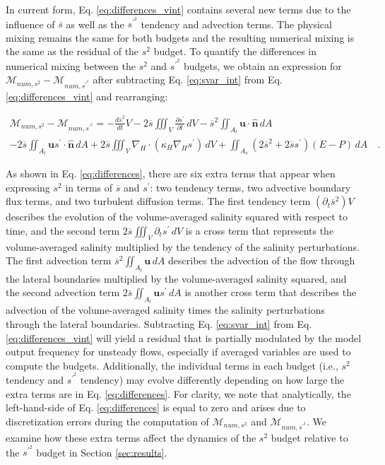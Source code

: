 \documentclass[draft]{agujournal2019}
\begin{document}
In current form, Eq. \ref{eq:differences_vint} contains several new terms due to the influence of $\overline{s}$ as well as the $s^{\prime^2}$ tendency and advection terms. The physical mixing remains the same for both budgets and the resulting numerical mixing is the same as the residual of the $s^2$ budget. To quantify the differences in numerical mixing between the $s^2$ and $s^{\prime^2}$ budgets, we obtain an expression for $\mathcal{M}_{num, s^2}-\mathcal{M}_{num, s^{\prime^2}}$ after subtracting Eq. \ref{eq:svar_int} from Eq. \ref{eq:differences_vint} and rearranging:
\begin{linenomath*}
\begin{equation} \label{eq:differences}
    \begin{split}
    \mathcal{M}_{num, s^2} - \mathcal{M}_{num, s^{\prime^2}}=-\frac{d \overline{s}^2}{d t} V   - 2\overline{s} \iiint_V \frac{\partial s^\prime}{\partial t} \, dV- \overline{s}^2 \iint_{A_l} \mathbf{u} \cdot \hat{\mathbf{n}} \, dA  \\ -2 \overline{s} \iint_{A_l} \mathbf{u}s^{\prime} \cdot \hat{\mathbf{n}} \, dA  + 2 \overline{s} \iiint_{V} \nabla_H \cdot (\kappa_H \nabla_H s^{\prime}) \, dV + \iint_{A_v} (2\overline{s}^2+2 \overline{s} s^\prime)(E-P) \, dA \quad .
    \end{split}
\end{equation}
\end{linenomath*}
As shown in Eq. \ref{eq:differences}, there are six extra terms that appear when expressing $s^2$ in terms of $\overline{s}$ and $s^{\prime}$: two tendency terms, two advective boundary flux terms, and two turbulent diffusion terms. The first tendency term $(\partial_t \overline{s}^2) V$ describes the evolution of the volume-averaged salinity squared with respect to time, and the second term $2\overline{s} \iiint_V \partial_t s^\prime \, dV$ is a cross term that represents the volume-averaged salinity multiplied by the tendency of the salinity perturbations. The first advection term $\overline{s}^2 \iint_{A_l} \mathbf{u} \, dA$ describes the advection of the flow through the lateral boundaries multiplied by the volume-averaged salinity squared, and the second advection term $2 \overline{s} \iint_{A_l} \textbf{u}s^{\prime} \, dA$ is another cross term that describes the advection of the volume-averaged salinity times the salinity perturbations through the lateral boundaries. Subtracting Eq. \ref{eq:svar_int} from Eq. \ref{eq:differences_vint} will yield a residual that is partially modulated by the model output frequency for unsteady flows, especially if averaged variables are used to compute the budgets. Additionally, the individual terms in each budget (i.e., $s^2$ tendency and $s^{\prime^2}$ tendency) may evolve differently depending on how large the extra terms are in Eq. \ref{eq:differences}. For clarity, we note that analytically, the left-hand-side of Eq. \ref{eq:differences} is equal to zero and arises due to discretization errors during the computation of $\mathcal{M}_{num, s^2}$ and $\mathcal{M}_{num, s^{\prime^2}}$.  We examine how these extra terms affect the dynamics of the $s^2$ budget relative to the $s^{\prime^2}$ budget in Section \ref{sec:results}.
\end{document}
